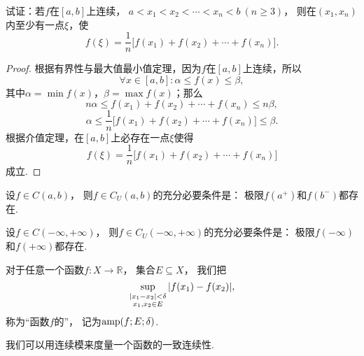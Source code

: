 \begin{example}
试证：若\(f\)在\([a,b]\)上连续，
\(a < x_1 < x_2 < \dotsb < x_n < b \ (n \geq 3)\)，
则在\((x_1,x_n)\)内至少有一点\(\xi\)，使\begin{equation*}
f(\xi) = \frac{1}{n} \bigl[
	f(x_1) + f(x_2) + \dotsb + f(x_n)
\bigr].
\end{equation*}
\begin{proof}
根据有界性与最大值最小值定理，因为\(f\)在\([a,b]\)上连续，所以\begin{equation*}
\forall x \in [a,b] :
	\alpha \leq f(x) \leq \beta,
\end{equation*}其中\(\alpha = \min f(x)\)，\(\beta = \max f(x)\)；那么\begin{equation*}
n \alpha \leq f(x_1) + f(x_2) + \dotsb + f(x_n) \leq n \beta,
\end{equation*}\begin{equation*}
\alpha \leq \frac{1}{n} \bigl[f(x_1) + f(x_2) + \dotsb + f(x_n)\bigr] \leq \beta.
\end{equation*}根据介值定理，在\([a,b]\)上必存在一点\(\xi\)使得\begin{equation*}
f(\xi) = \frac{1}{n} \bigl[ f(x_1) + f(x_2) + \dotsb + f(x_n) \bigr]
\end{equation*}成立.
\end{proof}
\end{example}

\begin{theorem}\label{theorem:极限.闭区间上连续函数的性质.开区间上的连续函数一致连续的充分必要条件1}
设\(f \in C(a,b)\)，
则\(f \in C_U(a,b)\)的充分必要条件是：
极限\(f(a^+)\)和\(f(b^-)\)都存在.
\end{theorem}

\begin{theorem}\label{theorem:极限.闭区间上连续函数的性质.开区间上的连续函数一致连续的充分必要条件2}
设\(f \in C(-\infty,+\infty)\)，
则\(f \in C_U(-\infty,+\infty)\)的充分必要条件是：
极限\(f(-\infty)\)和\(f(+\infty)\)都存在.
\end{theorem}

\begin{definition}
对于任意一个函数\(f\colon X\to\mathbb{R}\)，
集合\(E \subseteq X\)，
我们把\begin{equation*}
	\sup_{\substack{
		\abs{x_1-x_2}<\delta \\
		x_1,x_2 \in E
	}}\abs{f(x_1)-f(x_2)},
\end{equation*}
称为“函数\(f\)的”，
记为\(\operatorname{amp}(f;E;\delta)\).
\end{definition}

我们可以用连续模来度量一个函数的一致连续性.
